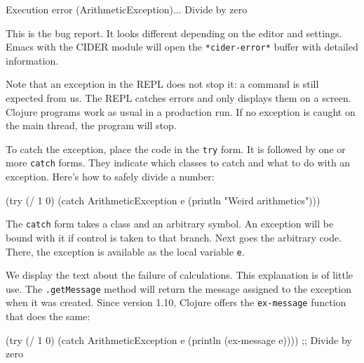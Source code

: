 
\begin{english}
  \begin{text}
Execution error (ArithmeticException)...
Divide by zero
  \end{text}
\end{english}

This is the bug report. It looks different depending on the editor and settings. Emacs with the CIDER module will open the \texttt{*cider\--error*} buffer with detailed information.


Note that an exception in the REPL does not stop it: a command is still expected from us. The REPL catches errors and only displays them on a screen. Clojure programs work as usual in a production run. If no exception is caught on the main thread, the program will stop.

To catch the exception, place the code in the \verb|try| form. It is followed by one or more \verb|catch| forms. They indicate which classes to catch and what to do with an exception. Here's how to safely divide a number: 


\begin{english}
  \begin{clojure}
(try
  (/ 1 0)
  (catch ArithmeticException e
    (println "Weird arithmetics")))
  \end{clojure}
\end{english}

The \verb|catch| form takes a class and an arbitrary symbol. An exception will be bound with it if control is taken to that branch. Next goes the arbitrary code. There, the exception is available as the local variable \verb|e|.


We display the text about the failure of calculations.
This explanation is of little use. The \verb|.getMessage| method will return the message assigned to the exception when it was created. Since version 1.10, Clojure offers the \verb|ex-message| function that does the same:

\begin{english}
  \begin{clojure}
(try
  (/ 1 0)
  (catch ArithmeticException e
    (println (ex-message e))))
;; Divide by zero
  \end{clojure}
\end{english}

